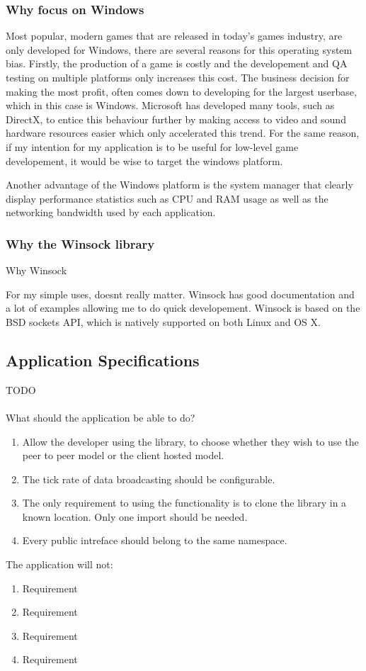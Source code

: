 \subsubsection{Why focus on Windows}
Most popular, modern games that are released in today's games industry, are only developed for Windows, there are several reasons for this operating system bias. Firstly, the production of a game is costly and the developement and QA testing on multiple platforms only increases this cost. The business decision for making the most profit, often comes down to developing for the largest userbase, which in this case is Windows. Microsoft has developed many tools, such as DirectX, to entice this behaviour further by making access to video and sound hardware resources easier which only accelerated this trend.
For the same reason, if my intention for my application is to be useful for low-level game developement, it would be wise to target the windows platform.

Another advantage of the Windows platform is the system manager that clearly display performance statistics such as CPU and RAM usage as well as the networking bandwidth used by each application.


\subsubsection{Why the Winsock library}
Why Winsock


For my simple uses, doesnt really matter. Winsock has good documentation and a lot of examples allowing me to do quick developement.
Winsock is based on the BSD sockets API, which is natively supported on both Linux and OS X.


\subsection{Application Specifications}
TODO
\\
\\
What should the application be able to do?
\begin{enumerate}
\item Allow the developer using the library, to choose whether they wish to use the peer to peer model or the client hosted model.
\item The tick rate of data broadcasting should be configurable.
\item The only requirement to using the functionality is to clone the library in a known location. Only one import should be needed.
\item Every public intreface should belong to the same namespace.
\end{enumerate}
The application will not:
\begin{enumerate}
\item Requirement
\item Requirement
\item Requirement
\item Requirement
\end{enumerate}


